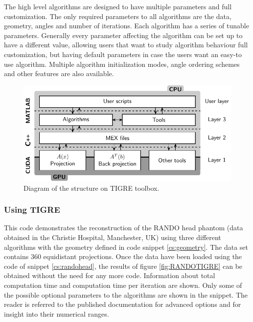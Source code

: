 The high level algorithms are designed to have multiple parameters and full customization. The only required parameters to all algorithms are the data, geometry, angles and number of iterations. Each algorithm has a series of tunable parameters. Generally every parameter affecting the algorithm can be set up to have a different value, allowing users that want to study algorithm behaviour full customization, but having default parameters in case the users want an easy-to use algorithm. Multiple algorithm initialization modes, angle ordering schemes and other features are also available. 

\begin{figure}
\begin{center}

\includegraphics{GPUmethods/structureTIGRE-figure0.pdf} 
\end{center}

\caption{\label{fig:structureTIGRE} Diagram of the structure on TIGRE toolbox.} 
\end{figure}

\subsubsection{Using TIGRE}
This code demonstrates the reconstruction of the RANDO head phantom (data obtained in the Christie Hospital, Manchester, UK) using three different algorithms with the geometry defined in code snippet \ref{cs:geometry}. The data set contains 360 equidistant projections. Once the data have been loaded using the code of snippet \ref{cs:randohead}, the results of figure \ref{fig:RANDOTIGRE} can be obtained without the need for any more code. Information about total computation time and computation time per iteration are shown. Only some of the possible optional parameters to the algorithms are shown in the snippet. The reader is referred to the published documentation for advanced options and for insight into their numerical ranges. 

